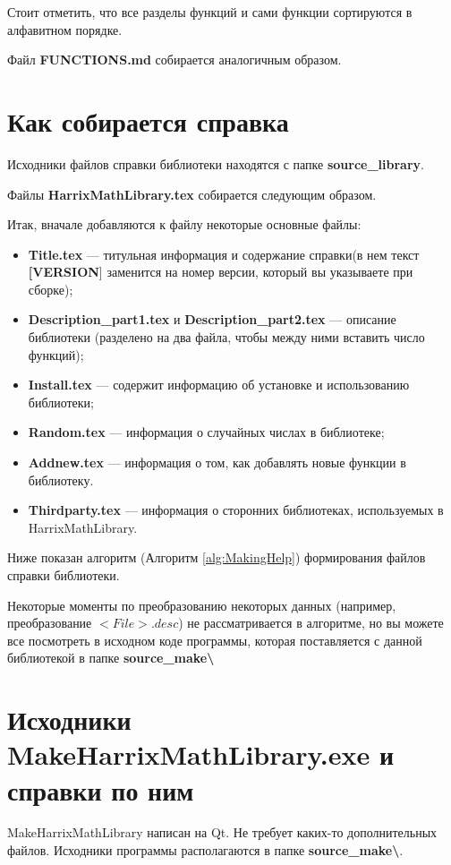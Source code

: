 \documentclass[a4paper,12pt]{article}
\begin{document}
Стоит отметить, что все разделы функций и сами функции сортируются в алфавитном порядке.

Файл \textbf{FUNCTIONS.md} собирается аналогичным образом.


\section{Как собирается справка}
Исходники файлов справки библиотеки находятся с папке
\textbf{source\_library}.

Файлы \textbf{HarrixMathLibrary.tex} собирается следующим образом.

Итак, вначале добавляются к файлу некоторые основные файлы:

\begin{itemize}
\item \textbf{Title.tex} --- титульная информация и содержание справки(в нем текст \textbf{[VERSION}] заменится на номер версии, который вы указываете при сборке);
\item \textbf{Description\_part1.tex} и \textbf{Description\_part2.tex} --- описание библиотеки (разделено на два файла, чтобы между ними вставить число функций);
\item \textbf{Install.tex} --- содержит информацию об установке и использованию библиотеки;
\item \textbf{Random.tex} --- информация о случайных числах в библиотеке;
\item \textbf{Addnew.tex} --- информация о том, как добавлять новые функции в библиотеку.
\item \textbf{Thirdparty.tex} --- информация о сторонних библиотеках, используемых в HarrixMathLibrary.
\end{itemize}

Ниже показан алгоритм (Алгоритм \ref{alg:MakingHelp}) формирования файлов справки библиотеки.

Некоторые моменты по преобразованию некоторых данных (например, преобразование $<File>.desc$) не рассматривается в алгоритме, но вы можете все посмотреть в исходном коде программы, которая поставляется с данной библиотекой в папке \textbf{source\_make\textbackslash}

\section{Исходники MakeHarrixMathLibrary.exe и справки по ним}

MakeHarrixMathLibrary написан на Qt.  Не требует каких-то дополнительных файлов. Исходники программы располагаются в папке \textbf{source\_make\textbackslash}.
\end{document}

